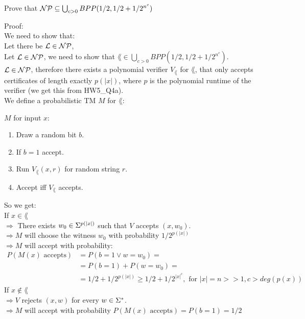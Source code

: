 Prove that $\mathcal{N}\mathcal{P} \subseteq \bigcup_{c>0} BPP(1/2, 1/2 + 1/2^{n^c})$

Proof: \\
We need to show that: \\
Let there be $\mathcal{L} \in \mathcal{N}\mathcal{P}$,  \\

Let $\mathcal{L} \in \mathcal{N}\mathcal{P}$, we need to show that $\lang \in \bigcup_{c>0} BPP(1/2, 1/2 + 1/2^{n^c})$. \\
$\mathcal{L} \in \mathcal{N}\mathcal{P}$, therefore there exists a polynomial verifier $V_\lang$ for $\lang$, that only accepts
certificates of length exactly $p(|x|)$, where $p$ is the polynomial runtime of the verifier
(we get this from HW5\_Q4a). \\
We define a probabilistic TM $M$ for $\lang$:

$M$ for input $x$:
\begin{enumerate}[1., itemsep=5pt]

    \item Draw a random bit $b$.

    \item If $b=1$ accept.

    \item Run $V_\lang(x, r)$ for random string $r$.

    \item Accept iff $V_\lang$ accepts.

\end{enumerate}

So we get: \\
If $x \in \lang$ \\
$\Rightarrow $ There exists $w_0 \in \Sigma^{p(|x|)}$ such that $V$ accepts $(x, w_0)$. \\
$\Rightarrow M$ will choose the witness $w_0$ with probability $1/2^{p(|x|)}$ \\
$\Rightarrow M$ will accept with probability: \\
$
    \begin{aligned}
        P(M(x) \text{ accepts}) & = P(b=1 \vee w=w_0) =                                                             \\
                                & = P(b=1) +  P(w=w_0) =                                                            \\
                                & = 1/2 + 1/2^{p(|x|)} \geq 1/2 + 1/2^{|x|^c}, \text{ for } |x|=n>>1, c > deg(p(x))
    \end{aligned}
$ \\
If $x \notin \lang$ \\
$\Rightarrow V$ rejects $(x, w)$ for every $w \in \Sigma^*$. \\
$\Rightarrow M$ will accept with probability $P(M(x) \text{ accepts}) = P(b=1) = 1/2$  \\

